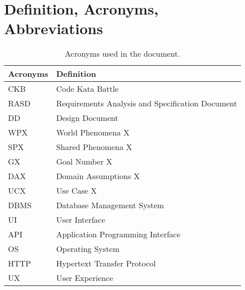 \section{Definition, Acronyms, Abbreviations}
\label{sec:definition_acronyms_abbreviations}%
\begin{table}[H]
    \begin{center}
        \begin{tabular}{ |l|l| }
            \hline
            \textbf{Acronyms} & \textbf{Definition}            \\
            \hline
            CKB              & Code Kata Battle    \\
            \hline
            RASD               & Requirements Analysis and Specification Document       \\
            \hline
            DD                & Design Document                \\
            \hline
            WPX               & World Phenomena X              \\
            \hline
            SPX               & Shared Phenomena X             \\
            \hline
            GX                & Goal Number X                  \\
            \hline
            DAX               & Domain Assumptions X           \\
            \hline
            UCX               & Use Case X                     \\
            \hline
            DBMS               & Database Management System        \\
            \hline
            UI                & User Interface               \\
            \hline
            API               & Application Programming Interface \\
            \hline
            OS               & Operating System               \\
            \hline
            HTTP             & Hypertext Transfer Protocol               \\
            \hline
            UX              & User Experience               \\
            \hline
        \end{tabular}
        \caption{Acronyms used in the document.}
        \label{tab:acronyms}%
    \end{center}
\end{table}

